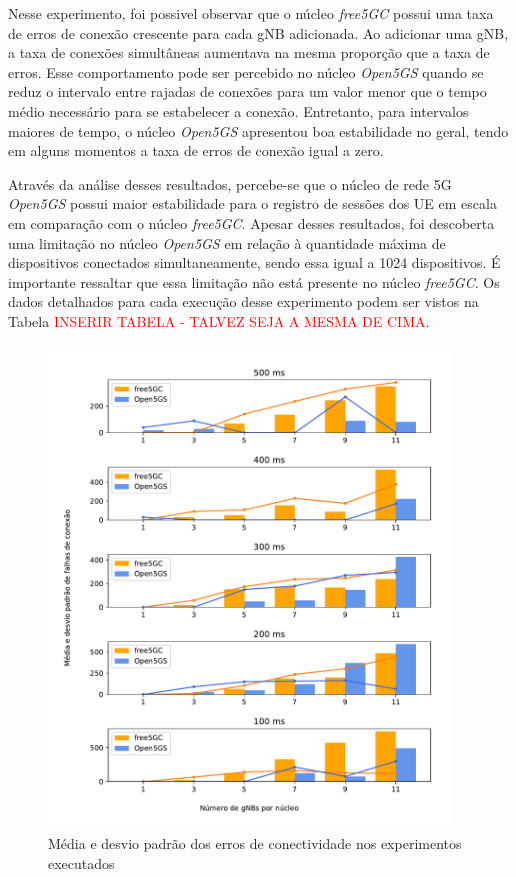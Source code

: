 Nesse experimento, foi possivel observar que o núcleo \textit{free5GC} possui uma taxa de erros de conexão crescente para cada gNB adicionada. Ao adicionar uma gNB, a taxa de conexões simultâneas aumentava na mesma proporção que a taxa de erros.
Esse comportamento pode ser percebido no núcleo \textit{Open5GS} quando se reduz o intervalo entre rajadas de conexões para um valor menor que o tempo médio necessário para se estabelecer a conexão.
Entretanto, para intervalos maiores de tempo, o núcleo \textit{Open5GS} apresentou boa estabilidade no geral, tendo em alguns momentos a taxa de erros de conexão igual a zero.

Através da análise desses resultados, percebe-se que o núcleo de rede 5G \textit{Open5GS} possui maior estabilidade para o registro de sessões dos UE em escala em comparação com o núcleo \textit{free5GC}.
Apesar desses resultados, foi descoberta uma limitação no núcleo \textit{Open5GS} em relação à quantidade máxima de dispositivos conectados simultaneamente, sendo essa igual a 1024 dispositivos.
É importante ressaltar que essa limitação não está presente no núcleo \textit{free5GC}.
Os dados detalhados para cada execução desse experimento podem ser vistos na Tabela \textcolor{red}{INSERIR TABELA - TALVEZ SEJA A MESMA DE CIMA}.

\begin{figure}[H]
    \centering
    \includegraphics[width=0.95\textwidth]{TG2/Chapters/DataAnalysis/Figures/EXP1-CONN_ERR-12C-8GB.pdf}
    \caption{Média e desvio padrão dos erros de conectividade nos experimentos executados}
    \label{fig:exp1_conn_err}
\end{figure}
